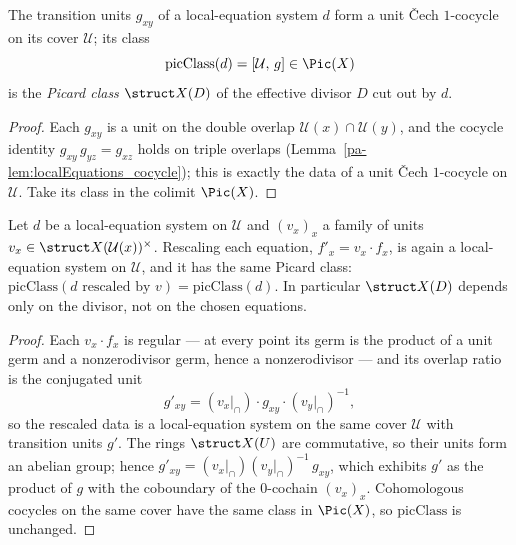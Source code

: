 \begin{definition}
  \label{pa-def:localEquations_picClass}
  \leanok

  The transition units \(g_{xy}\) of a local-equation system \(d\) form a unit \v Cech
  \(1\)-cocycle on its cover \(\mathcal U\); its class
  \[
    \mathrm{picClass}(d) = [\mathcal U,\, g] \in \Pic(X)
  \]
  is the \emph{Picard class} \(\struct X(D)\) of the effective divisor \(D\) cut out by \(d\).
\end{definition}
\begin{proof}
  \leanok
  Each \(g_{xy}\) is a unit on the double overlap \(\mathcal U(x) \cap \mathcal U(y)\), and the
  cocycle identity \(g_{xy}\, g_{yz} = g_{xz}\) holds on triple overlaps
  (Lemma~\ref{pa-lem:localEquations_cocycle}); this is exactly the data of a unit \v Cech
  \(1\)-cocycle on \(\mathcal U\). Take its class in the colimit \(\Pic(X)\).
\end{proof}

\begin{lemma}
  \label{pa-lem:localEquations_rescale}
  \leanok

  Let \(d\) be a local-equation system on \(\mathcal U\) and \((v_x)_x\) a family of units
  \(v_x \in \struct X(\mathcal U(x))^{\times}\). Rescaling each equation, \(f'_x = v_x \cdot f_x\),
  is again a local-equation system on \(\mathcal U\), and it has the same Picard class:
  \(\mathrm{picClass}(d\text{ rescaled by }v) = \mathrm{picClass}(d)\). In particular \(\struct
  X(D)\) depends only on the divisor, not on the chosen equations.
\end{lemma}
\begin{proof}
  \leanok
  Each \(v_x \cdot f_x\) is regular --- at every point its germ is the product of a unit germ and a
  nonzerodivisor germ, hence a nonzerodivisor --- and its overlap ratio is the conjugated unit
  \[
    g'_{xy} = (v_x|_{\cap}) \cdot g_{xy} \cdot (v_y|_{\cap})^{-1},
  \]
  so the rescaled data is a local-equation system on the same cover \(\mathcal U\) with transition
  units \(g'\). The rings \(\struct X(U)\) are commutative, so their units form an abelian group;
  hence \(g'_{xy} = (v_x|_{\cap})(v_y|_{\cap})^{-1}\, g_{xy}\), which exhibits \(g'\) as the product
  of \(g\) with the coboundary of the \(0\)-cochain \((v_x)_x\). Cohomologous cocycles on the same
  cover have the same class in \(\Pic(X)\), so \(\mathrm{picClass}\) is unchanged.
\end{proof}

